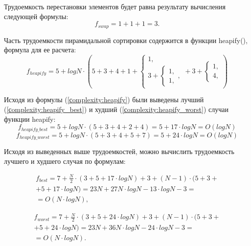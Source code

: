 Трудоемкость перестановки элементов будет равна результату вычисления следующей формулы:
\begin{equation}
	\label{сomplexity:swap}
	f_{swap} = 1 + 1 + 1 = 3.
\end{equation}

Часть трудоемкости пирамидальной сортировки содержится в функции heapify(), формула для ее расчета:
\begin{equation}
	\label{сomplexity:heapify}
	f_{heapify} = 5 + log N \cdot (5 + 3 + 4 + 1 +
	\begin{cases}
		1, \\
		3 + \begin{cases}
			1, \\
			1,
		\end{cases},
	\end{cases} + 3 +
	\begin{cases}
		1, \\
		4,
	\end{cases})
\end{equation}

Исходя из формулы (\ref{сomplexity:heapify}) были выведены лучший (\ref{сomplexity:heapify_best}) и худший (\ref{сomplexity:heapify_worst}) случаи функции heapify:
\begin{equation}
	\label{сomplexity:heapify_best}
	f_{heapify\_best} = 5 + log N \cdot (5 + 3 + 4 + 2 + 4) = 5 + 17 \cdot log N = O(log N)
\end{equation}
\begin{equation}
	\label{сomplexity:heapify_worst}
	f_{heapify\_worst} = 5 + log N \cdot (5 + 3 + 4 + 5 + 7) = 5 + 24 \cdot log N = O(log N)
\end{equation}

Исходя из выведенных выше трудоемкостей, можно вычислить трудоемкость лучшего и худшего случая по формулам:

\begin{equation}
	\label{сomplexity:heap_best_p}
	\begin{gathered}
		f_{best} = 7 + \frac{N}{2} \cdot (3 + 5 + 17 \cdot log N) + 3 + (N - 1) \cdot (5 + 3 + \\
		+ 5 + 17 \cdot log N) = 23N + 27N \cdot log N - 13 \cdot log N - 3 =\\
		= O(N \cdot log N),
	\end{gathered}
\end{equation}

\begin{equation}
	\label{сomplexity:heap_worst_p}
	\begin{gathered}
		f_{worst} = 7 + \frac{N}{2} \cdot (3 + 5 + 24 \cdot log N) + 3 + (N - 1) \cdot (5 + 3 + \\
		+ 5 + 24 \cdot log N) = 23N + 36N \cdot log N - 24 \cdot log N - 3 =\\
		= O(N \cdot log N).
	\end{gathered}
\end{equation}

